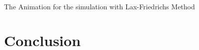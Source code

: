 \documentclass{beamer}
\begin{document}
\begin{frame}{The Animation for the simulation with Lax-Friedrichs Method}
	\centering
\end{frame}

\section{Conclusion}
\end{document}
